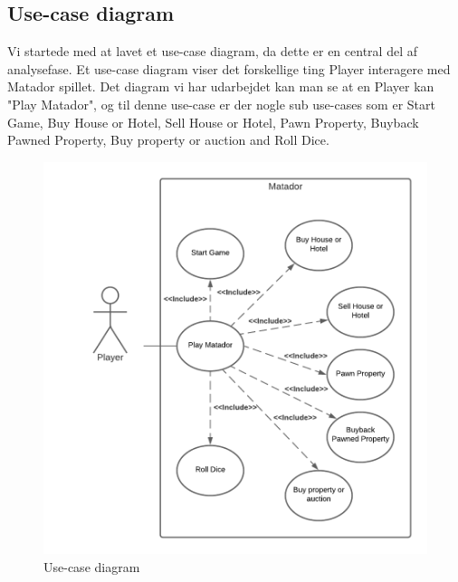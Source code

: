 \begin{flushleft}
\subsection{Use-case diagram}
Vi startede med at lavet et use-case diagram, da dette er en central del af analysefase. Et use-case diagram viser det forskellige ting Player interagere med Matador spillet. Det diagram vi har udarbejdet kan man se at en Player kan "Play Matador", og til denne use-case er der nogle sub use-cases som er Start Game, Buy House or Hotel, Sell House or Hotel, Pawn Property, Buyback Pawned Property, Buy property or auction and Roll Dice. 
\begin{figure}[htp]
    \centering
    \includegraphics[width=12cm]{Report/figures/Use Case Diagram.png}
    \caption{Use-case diagram}
\end{figure}


\end{flushleft}
